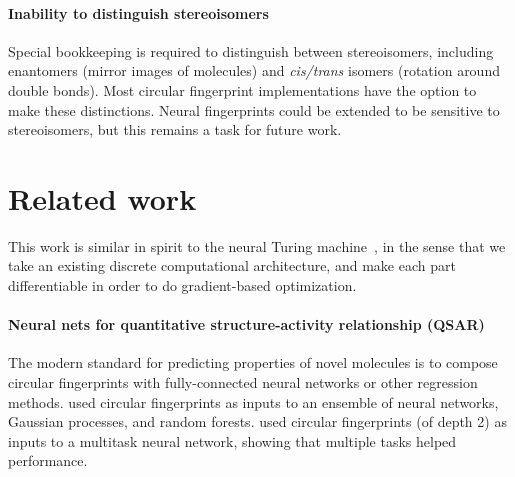 \documentclass{article}
\newcommand{\citep}{\cite}
\begin{document}
\paragraph{Inability to distinguish stereoisomers}
Special bookkeeping is required to distinguish between stereoisomers, including enantomers (mirror images of molecules) and {\it cis/trans} isomers (rotation around double bonds).
Most circular fingerprint implementations have the option to make these distinctions.
Neural fingerprints could be extended to be sensitive to stereoisomers, but this remains a task for future work.






\section{Related work}
This work is similar in spirit to the neural Turing machine~\citep{graves2014neural}, in the sense that we take an existing discrete computational architecture, and make each part differentiable in order to do gradient-based optimization.

\paragraph{Neural nets for quantitative structure-activity relationship (QSAR)}
The modern standard for predicting properties of novel molecules is to compose circular fingerprints with fully-connected neural networks or other regression methods.
\cite{dahl2014multi} used circular fingerprints as inputs to an ensemble of neural networks, Gaussian processes, and random forests.
\cite{ramsundar2015massively} used circular fingerprints (of depth 2) as inputs to a multitask neural network, showing that multiple tasks helped performance.
\end{document}
